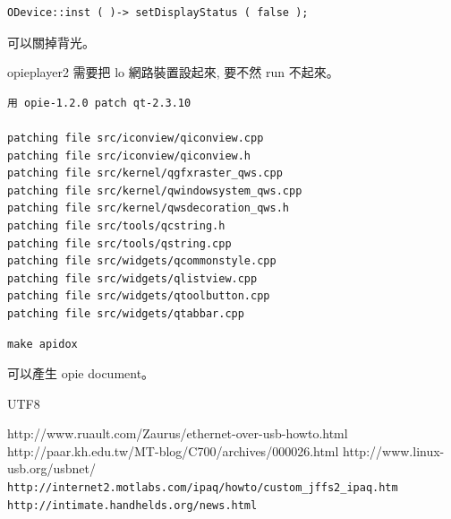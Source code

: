 \documentclass[12pt,a4paper]{article}
\begin{document}
\begin{CJK}{UTF8}{bsmi}
\begin{verbatim}
ODevice::inst ( )-> setDisplayStatus ( false );
\end{verbatim}

可以關掉背光。

opieplayer2 需要把 lo 網路裝置設起來,
要不然 run 不起來。

\begin{verbatim}
用 opie-1.2.0 patch qt-2.3.10

patching file src/iconview/qiconview.cpp
patching file src/iconview/qiconview.h
patching file src/kernel/qgfxraster_qws.cpp
patching file src/kernel/qwindowsystem_qws.cpp
patching file src/kernel/qwsdecoration_qws.h
patching file src/tools/qcstring.h
patching file src/tools/qstring.cpp
patching file src/widgets/qcommonstyle.cpp
patching file src/widgets/qlistview.cpp
patching file src/widgets/qtoolbutton.cpp
patching file src/widgets/qtabbar.cpp
\end{verbatim}


\begin{verbatim}
make apidox
\end{verbatim}

\parindent=0cm
\parskip=20pt

可以產生 opie document。
\end{CJK}{UTF8}


\begin{thebibliography}{99}
 http://www.ruault.com/Zaurus/ethernet-over-usb-howto.html
 http://paar.kh.edu.tw/MT-blog/C700/archives/000026.html
 http://www.linux-usb.org/usbnet/
 \verb+http://internet2.motlabs.com/ipaq/howto/custom_jffs2_ipaq.htm+
 \verb+http://intimate.handhelds.org/news.html+
\end{thebibliography}
  
\end{document}
